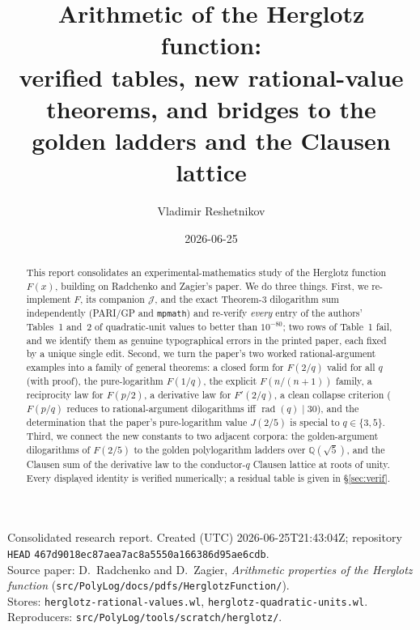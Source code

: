 \documentclass[11pt]{article}
\title{Arithmetic of the Herglotz function:\\
verified tables, new rational-value theorems, and bridges to the\\ golden ladders and the Clausen lattice}
\author{Vladimir Reshetnikov}
\date{2026-06-25}
\newcommand{\Jcal}{\mathcal{J}}
\newcommand{\rad}{\operatorname{rad}}
\theoremstyle{plain}\newtheorem{theorem}{Theorem}\newtheorem{proposition}[theorem]{Proposition}
\theoremstyle{remark}\newtheorem{remark}[theorem]{Remark}
\begin{document}
\maketitle
\begin{center}\small
Consolidated research report. Created (UTC) 2026-06-25T21:43:04Z; repository \texttt{HEAD}
\texttt{467d9018ec87aea7ac8a5550a166386d95ae6cdb}.\\
Source paper: D.\ Radchenko and D.\ Zagier, \emph{Arithmetic properties of the Herglotz function}
(\texttt{src/PolyLog/docs/pdfs/HerglotzFunction/}).\\
Stores: \texttt{herglotz-rational-values.wl}, \texttt{herglotz-quadratic-units.wl}.
Reproducers: \texttt{src/PolyLog/tools/scratch/herglotz/}.
\end{center}

\begin{abstract}
This report consolidates an experimental-mathematics study of the Herglotz function $F(x)$, building on
Radchenko and Zagier's paper. We do three things. First, we re-implement $F$, its companion $\Jcal$, and the
exact Theorem-3 dilogarithm sum independently (PARI/GP and \texttt{mpmath}) and re-verify \emph{every} entry
of the authors' Tables~1 and~2 of quadratic-unit values to better than $10^{-80}$; two rows of Table~1 fail,
and we identify them as genuine typographical errors in the printed paper, each fixed by a unique single
edit. Second, we turn the paper's two worked rational-argument examples into a family of general theorems:
a closed form for $F(2/q)$ valid for all $q$ (with proof), the pure-logarithm $F(1/q)$, the explicit
$F(n/(n+1))$ family, a reciprocity law for $F(p/2)$, a derivative law for $F'(2/q)$, a clean collapse
criterion ($F(p/q)$ reduces to rational-argument dilogarithms iff $\rad(q)\mid 30$), and the determination
that the paper's pure-logarithm value $J(2/5)$ is special to $q\in\{3,5\}$. Third, we connect the new
constants to two adjacent corpora: the golden-argument dilogarithms of $F(2/5)$ to the golden polylogarithm
ladders over $\mathbb Q(\sqrt5)$, and the Clausen sum of the derivative law to the conductor-$q$ Clausen
lattice at roots of unity. Every displayed identity is verified numerically; a residual table is given in
\S\ref{sec:verif}.
\end{abstract}

\tableofcontents
\end{document}
